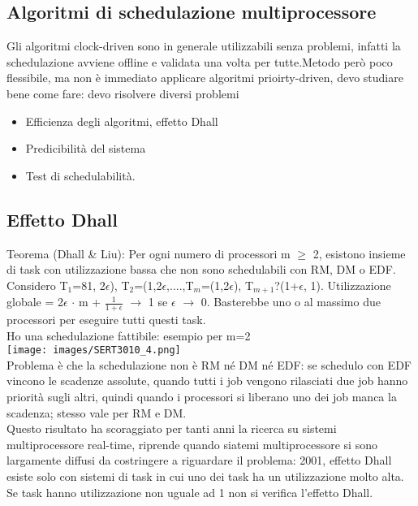 \documentclass[18px]{article}
\begin{document}
\subsection{Algoritmi di schedulazione multiprocessore}
Gli algoritmi clock-driven sono in generale utilizzabili senza problemi, infatti la schedulazione avviene offline e validata una volta per tutte.Metodo però poco flessibile, ma non è immediato applicare algoritmi prioirty-driven, devo studiare bene come fare: devo risolvere diversi problemi
\begin{itemize}
\item Efficienza degli algoritmi, effetto Dhall
\item Predicibilità del sistema
\item Test di schedulabilità.
\end{itemize}
\subsection{Effetto Dhall}
Teorema (Dhall \& Liu): Per ogni numero di processori m $\geq$ 2, esistono insieme di task con utilizzazione bassa che non sono schedulabili con RM, DM o EDF.\\ Considero T$_{1}$=81, 2$\epsilon$), T$_{2}$=(1,2$\epsilon$,....,T$_{m}$=(1,2$\epsilon$), T$_{m+1}$?(1+$\epsilon$, 1). Utilizzazione globale = 2$\epsilon$ $\cdot$ m + $\frac{1}{1+ \epsilon}$ $\rightarrow$ 1 se $\epsilon$ $\rightarrow$ 0. Basterebbe uno o al massimo due processori per eseguire tutti questi task.\\ Ho una schedulazione fattibile: esempio per m=2\\
\texttt{[image: images/SERT3010\_4.png]}\\
Problema è che la schedulazione non è RM né DM né EDF: se schedulo con EDF vincono le scadenze assolute, quando tutti i job vengono rilasciati due job hanno priorità sugli altri, quindi quando i processori si liberano uno dei job manca la scadenza; stesso vale per RM e DM.\\ Questo risultato ha scoraggiato per tanti anni la ricerca su sistemi multiprocessore real-time, riprende quando siatemi multiprocessore si sono largamente diffusi da costringere a riguardare il problema: 2001, effetto Dhall esiste solo con sistemi di task in cui uno dei task ha un utilizzazione molto alta. Se task hanno utilizzazione non uguale ad 1 non si verifica l'effetto Dhall.
\end{document}
